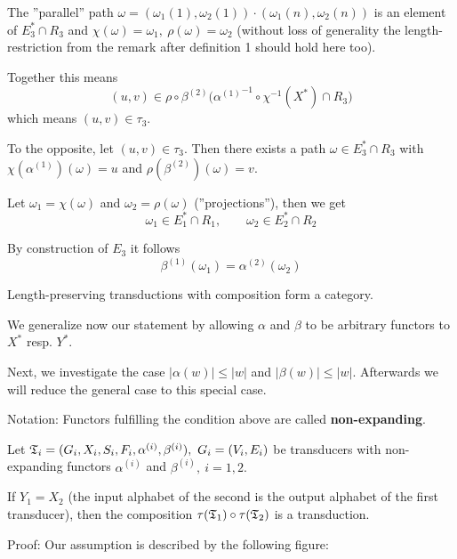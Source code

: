 The ''parallel'' path $\omega = (\omega_1(1), \omega_2(1)) \cdot
(\omega_1(n), \omega_2(n))$ is an element of $E_3^* \cap R_3$ and 
$\chi(\omega) = \omega_1,\ \rho(\omega) = \omega_2$ (without loss of
generality the length-restriction from the remark after definition 1 should
hold here too).

Together this means
\[ (u, v) \in \rho \circ \beta^{(2)} \big( {\alpha^{(1)}}^{-1} \circ
\chi^{-1}(X^*) \cap R_3 \big) \]
which means $(u, v) \in \tau_3$.

To the opposite, let $(u, v) \in \tau_3$. Then there exists a path $\omega \in
E_3^* \cap R_3$ with $\chi(\alpha^{(1)})(\omega) = u$ and $\rho(\beta^{(2)})(\omega)
= v$.

Let $\omega_1 = \chi(\omega)$ and $\omega_2 = \rho(\omega)$ (''projections''), then we get
\[ \omega_1 \in E_1^* \cap R_1,\qquad \omega_2 \in E_2^* \cap R_2 \]

By construction of $E_3$ it follows
\[ \beta^{(1)}(\omega_1) = \alpha^{(2)}(\omega_2) \]

\begin{corollary}
Length-preserving transductions with composition form a category.
\end{corollary}

We generalize now our statement by allowing $\alpha$ and $\beta$ to be arbitrary
functors to $X^*$ resp. $Y^*$.

Next, we investigate the case $|\alpha(w)| \leq |w|$ and $|\beta(w)| \leq |w|$.
Afterwards we will reduce the general case to this special case.

Notation: Functors fulfilling the condition above are called {\bf
non-expanding}.

\begin{theorem}
Let $\mbox{$\mathfrak{T}$}_i = (G_i, X_i, S_i, F_i, \alpha^{(i)}, \beta^{(i)}),\ G_i = (V_i,
E_i)$ be transducers with non-expanding functors $\alpha^{(i)}$ and
$\beta^{(i)},\ i = 1,2.$

If $Y_1 = X_2$ (the input alphabet of the second is the output alphabet of the
first transducer), then the composition $\tau(\mbox{$\mathfrak{T}$}_1) \circ \tau(\mbox{$\mathfrak{T}$}_2)$
is a transduction.
\end{theorem}

Proof: Our assumption is described by the following figure:

\begin{center}
\end{center}

